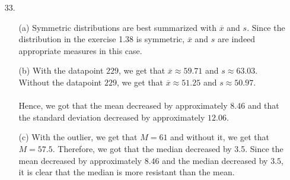\documentclass[11pt, a4paper]{article}
\begin{document}
\begin{itemize}
\item[]
\item[]

\item[33.]
\begin{itemize}
\item[(a)]
Symmetric distributions are best summarized with $\overline{x}$ and $s$.
Since the distribution in the exercise 1.38 is symmetric, $\overline{x}$
and $s$ are indeed appropriate measures in this case.

\item[]

\item[(b)]
With the datapoint $229$, we get that $\overline{x} \approx 59.71$ and $s \approx 63.03$.\\
Without the datapoint $229$, we get that $\overline{x} \approx 51.25$ and $s \approx 50.97$.\\\\
Hence, we got that the mean decreased by approximately $8.46$ and that the standard deviation
decreased by approximately $12.06$.

\item[]

\item[(c)]
With the outlier, we get that $M = 61$ and without it, we get that $M = 57.5$.
Therefore, we got that the median decreased by 3.5. Since the mean decreased
by approximately $8.46$ and the median decreased by $3.5$, it is clear that
the median is more resistant than the mean.
\end{itemize}

\end{itemize}
\end{document}
